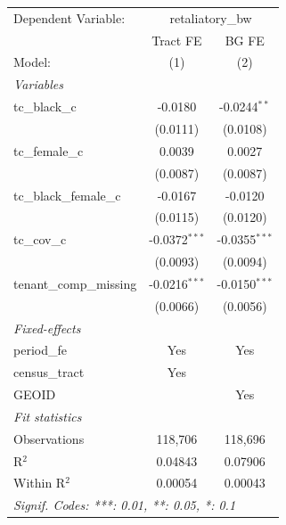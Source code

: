 \begin{tabular}{lcc}
   \tabularnewline \midrule \midrule
   Dependent Variable: & \multicolumn{2}{c}{retaliatory\_bw}\\
                           & Tract FE        & BG FE \\   
   Model:                  & (1)             & (2)\\  
   \midrule
   \emph{Variables}\\
   tc\_black\_c            & -0.0180         & -0.0244$^{**}$\\   
                           & (0.0111)        & (0.0108)\\   
   tc\_female\_c           & 0.0039          & 0.0027\\   
                           & (0.0087)        & (0.0087)\\   
   tc\_black\_female\_c    & -0.0167         & -0.0120\\   
                           & (0.0115)        & (0.0120)\\   
   tc\_cov\_c              & -0.0372$^{***}$ & -0.0355$^{***}$\\   
                           & (0.0093)        & (0.0094)\\   
   tenant\_comp\_missing   & -0.0216$^{***}$ & -0.0150$^{***}$\\   
                           & (0.0066)        & (0.0056)\\   
   \midrule
   \emph{Fixed-effects}\\
   period\_fe              & Yes             & Yes\\  
   census\_tract           & Yes             & \\  
   GEOID                   &                 & Yes\\  
   \midrule
   \emph{Fit statistics}\\
   Observations            & 118,706         & 118,696\\  
   R$^2$                   & 0.04843         & 0.07906\\  
   Within R$^2$            & 0.00054         & 0.00043\\  
   \midrule \midrule
   \multicolumn{3}{l}{\emph{Signif. Codes: ***: 0.01, **: 0.05, *: 0.1}}\\
\end{tabular}
\par\endgroup
\begingroup
\centering
